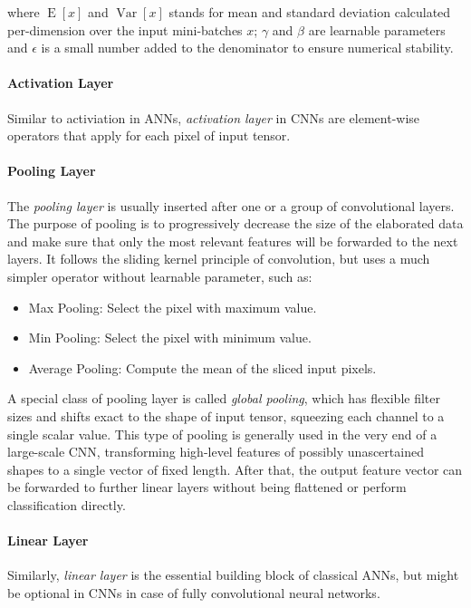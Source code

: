             where $\operatorname{E}[x]$ and $\operatorname{Var}[x]$ stands for mean and standard deviation calculated per-dimension over the input mini-batches $x$; $\gamma$ and $\beta$ are learnable parameters and $\epsilon$ is a small number added to the denominator to ensure numerical stability.

        \paragraph{Activation Layer}
            Similar to activiation in ANNs, \textit{activation layer} in CNNs are element-wise operators that apply for each pixel of input tensor.

        \paragraph{Pooling Layer}
            The \textit{pooling layer} is usually inserted after one or a group of convolutional layers.
            The purpose of pooling is to progressively decrease the size of the elaborated data and make sure that only the most relevant features will be forwarded to the next layers.
            It follows the sliding kernel principle of convolution, but uses a much simpler operator without learnable parameter, such as:

            \begin{itemize}
                \item Max Pooling: Select the pixel with maximum value.
                \item Min Pooling: Select the pixel with minimum value.
                \item Average Pooling: Compute the mean of the sliced input pixels.
            \end{itemize}

            A special class of pooling layer is called \textit{global pooling}, which has flexible filter sizes and shifts exact to the shape of input tensor, squeezing each channel to a single scalar value.
            This type of pooling is generally used in the very end of a large-scale CNN, transforming high-level features of possibly unascertained shapes to a single vector of fixed length.
            After that, the output feature vector can be forwarded to further linear layers without being flattened or perform classification directly.

        \paragraph{Linear Layer}
            Similarly, \textit{linear layer} is the essential building block of classical ANNs, but might be optional in CNNs in case of fully convolutional neural networks.

